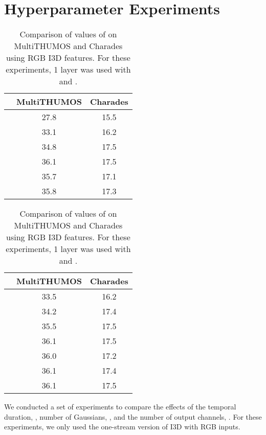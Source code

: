 \documentclass{article}
\begin{document}
\section{Hyperparameter Experiments}
\begin{table}
\begin{minipage}{0.48\textwidth}
\caption{Comparison of various values of  on MultiTHUMOS and Charades using RGB I3D features. For these experiments, 1 layer was used with  and .}
\label{tab:M-exp}
\centering
\begin{tabular}{c|cc}
\toprule
 & MultiTHUMOS & Charades \\
\midrule
      & 27.8 & 15.5  \\
      & 33.1 & 16.2 \\
      & 34.8 & 17.5  \\
     & 36.1 & 17.5  \\
     & 35.7 & 17.1  \\
     & 35.8 & 17.3  \\
\bottomrule
\end{tabular}
\end{minipage}
\hfill
\begin{minipage}{0.48\textwidth}
\caption{Comparison of values of  on MultiTHUMOS and Charades using RGB I3D features. For these experiments, 1 layer was used with  and .}
\label{tab:cout-exp}
\centering
\begin{tabular}{c|cc}
\toprule
 & MultiTHUMOS & Charades \\
\midrule
      & 33.5 & 16.2  \\
      & 34.2 & 17.4  \\
      & 35.5 & 17.5  \\
     & 36.1 & 17.5  \\
     & 36.0 & 17.2  \\
     & 36.1 & 17.4  \\
     & 36.1 & 17.5  \\
\bottomrule
\end{tabular}
\end{minipage}
\end{table}
We conducted a set of experiments to compare the effects of the temporal duration, , number of Gaussians, , and the number of output channels, . For these experiments, we only used the one-stream version of I3D with RGB inputs.
\end{document}
